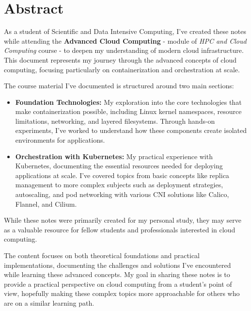 \chapter*{Abstract}

As a student of Scientific and Data Intensive Computing, I've created these notes while attending the \textbf{Advanced Cloud Computing} - module of \textit{HPC and Cloud Computing} course - to deepen my understanding of modern cloud infrastructure. This document represents my journey through the advanced concepts of cloud computing, focusing particularly on containerization and orchestration at scale.

The course material I've documented is structured around two main sections:
\begin{itemize}
    \item \textbf{Foundation Technologies:} My exploration into the core technologies that make containerization possible, including Linux kernel namespaces, resource limitations, networking, and layered filesystems. Through hands-on experiments, I've worked to understand how these components create isolated environments for applications.
    \item \textbf{Orchestration with Kubernetes:} My practical experience with Kubernetes, documenting the essential resources needed for deploying applications at scale. I've covered topics from basic concepts like replica management to more complex subjects such as deployment strategies, autoscaling, and pod networking with various CNI solutions like Calico, Flannel, and Cilium.
\end{itemize}

While these notes were primarily created for my personal study, they may serve as a valuable resource for fellow students and professionals interested in cloud computing.

The content focuses on both theoretical foundations and practical implementations, documenting the challenges and solutions I've encountered while learning these advanced concepts. My goal in sharing these notes is to provide a practical perspective on cloud computing from a student's point of view, hopefully making these complex topics more approachable for others who are on a similar learning path.